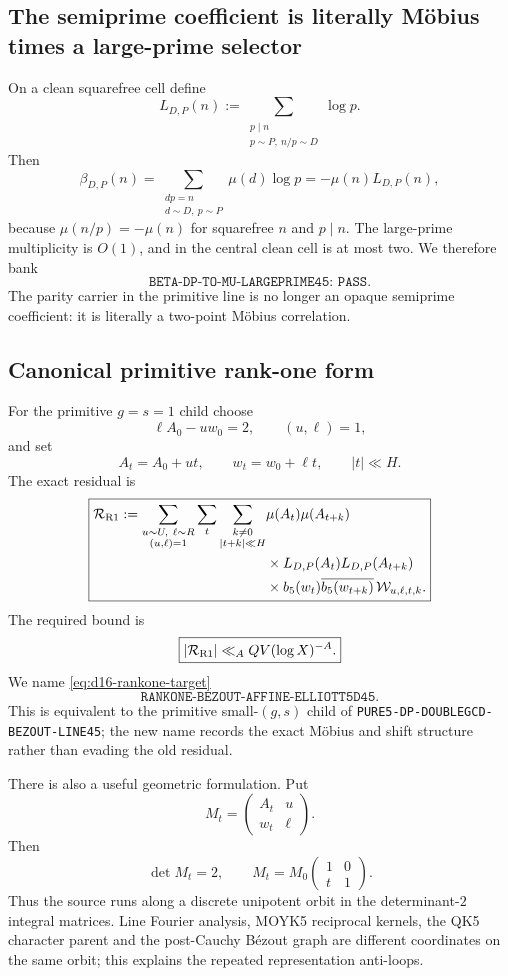 \documentclass[11pt]{article}
\theoremstyle{definition}
\newcommand{\1}{\mathbf 1}
\begin{document}
\subsection{The semiprime coefficient is literally M\"obius times a large-prime selector}
On a clean squarefree cell define
\[
 L_{D,P}(n)
 :=
 \sum_{\substack{p\mid n\\p\sim P,\ n/p\sim D}}\log p.
\]
Then
\[
 \beta_{D,P}(n)
 =\sum_{\substack{dp=n\\d\sim D,\ p\sim P}}\mu(d)\log p
 =-\mu(n)L_{D,P}(n),
\]
because $\mu(n/p)=-\mu(n)$ for squarefree $n$ and $p\mid n$.  The
large-prime multiplicity is $O(1)$, and in the central clean cell is at most
two.  We therefore bank
\[
 \boxed{\texttt{BETA-DP-TO-MU-LARGEPRIME45: PASS}}.
\]
The parity carrier in the primitive line is no longer an opaque semiprime
coefficient: it is literally a two-point M\"obius correlation.

\subsection{Canonical primitive rank-one form}
For the primitive $g=s=1$ child choose
\[
 \ell A_0-u w_0=2,\qquad (u,\ell)=1,
\]
and set
\[
 A_t=A_0+ut,\qquad w_t=w_0+\ell t,\qquad |t|\ll H.
\]
The exact residual is
\begin{equation}
\boxed{
\begin{aligned}
 \mathcal R_{\rm R1}
 :=
 \sum_{\substack{u\sim U,\ \ell\sim R\\(u,\ell)=1}}
 \sum_t\sum_{\substack{k\ne0\\|t+k|\ll H}}
 &\mu(A_t)\mu(A_{t+k})\\
 &\times L_{D,P}(A_t)L_{D,P}(A_{t+k})\\
 &\times b_5(w_t)\overline{b_5(w_{t+k})}\,
 \mathcal W_{u,\ell,t,k}.
\end{aligned}}
\label{eq:d16-rankone-residual}
\end{equation}
The required bound is
\begin{equation}
 \boxed{|\mathcal R_{\rm R1}|\ll_A QV(\log X)^{-A}.}
 \label{eq:d16-rankone-target}
\end{equation}
We name \eqref{eq:d16-rankone-target}
\[
 \boxed{\texttt{RANKONE-BEZOUT-AFFINE-ELLIOTT5D45}}.
\]
This is equivalent to the primitive small-$(g,s)$ child of
\texttt{PURE5-DP-DOUBLEGCD-BEZOUT-LINE45}; the new name records the exact
M\"obius and shift structure rather than evading the old residual.

There is also a useful geometric formulation.  Put
\[
 M_t=
 \begin{pmatrix}
 A_t&u\\
 w_t&\ell
 \end{pmatrix}.
\]
Then
\[
 \det M_t=2,\qquad
 M_t=M_0
 \begin{pmatrix}1&0\\t&1\end{pmatrix}.
\]
Thus the source runs along a discrete unipotent orbit in the determinant-$2$
integral matrices.  Line Fourier analysis, MOYK5 reciprocal kernels, the QK5
character parent and the post-Cauchy B\'ezout graph are different coordinates
on the same orbit; this explains the repeated representation anti-loops.
\end{document}
